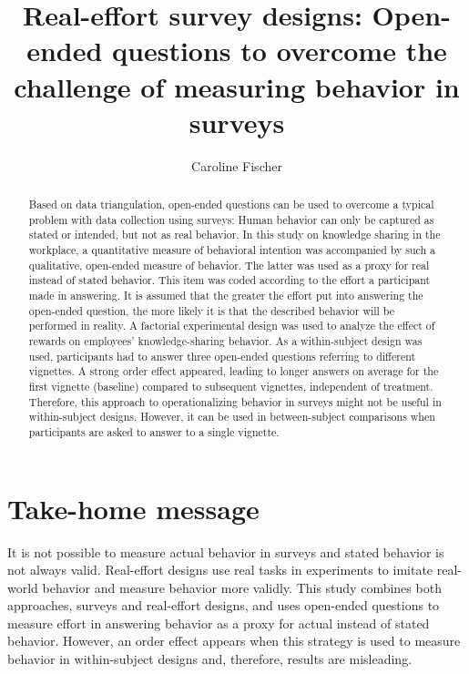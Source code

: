 \documentclass[twocolumn, serif, empirical, authordate]{jote-article}
\title{Real-effort survey designs: Open-ended questions to overcome the challenge of measuring behavior in surveys}
\author[1]{Caroline Fischer}
\affil[1]{University  of  Potsdam}
\begin{document}
    \begin{frontmatter}
    \maketitle
    \begin{abstract}
    Based on data triangulation, open-ended questions can be used to overcome a typical problem with data collection using surveys: Human behavior can only be captured as stated or intended, but not as real behavior. In this study on knowledge sharing in the workplace, a quantitative measure of behavioral intention was accompanied by such a qualitative, open-ended measure of behavior. The latter was used as a proxy for real instead of stated behavior. This item was coded according to the effort a participant made in answering. It is assumed that the greater the effort put into answering the open-ended question, the more likely it is that the described behavior will be performed in reality. A factorial experimental design was used to analyze the effect of rewards on employees' knowledge-sharing behavior. As a within-subject design was used, participants had to answer three open-ended questions referring to different vignettes. A strong order effect appeared, leading to longer answers on average for the first vignette (baseline) compared to subsequent vignettes, independent of treatment. Therefore, this approach to operationalizing behavior in surveys might not be useful in within-subject designs. However, it can be used in between-subject comparisons when participants are asked to answer to a single vignette.
    \end{abstract}
    \end{frontmatter}




\section*{Take-home message}

It is not possible to measure actual behavior in surveys and stated behavior is not always valid. Real-effort designs use real tasks in experiments to imitate real-world behavior and measure behavior more validly. This study combines both approaches, surveys and real-effort designs, and uses open-ended questions to measure effort in answering behavior as a proxy for actual instead of stated behavior. However, an order effect appears when this strategy is used to measure behavior in within-subject designs and, therefore, results are misleading.
\end{document}
